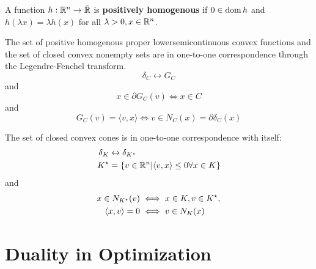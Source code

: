 \begin{defn}
  \label{defn:conjugate_functions:9}
  A function $h: \mathbb{R}^{n} \rightarrow \bar {\mathbb{R}}$ is \textbf{positively
    homogenous} if $0 \in \operatorname*{dom} h$ and $h(\lambda x) = \lambda h(x)$
  for all $\lambda > 0, x \in \mathbb{R}^{n}$.
\end{defn}

\begin{proposition}
  The set of positive homogenous proper lowersemicontinuous convex
  functions and the set of closed convex nonempty sets are in
  one-to-one correspondence through the Legendre-Fenchel transform.
  \begin{equation}
    \label{eq:64}
    \delta_{C} \leftrightarrow G_{C}    
  \end{equation}
  and
  \begin{equation}
    \label{eq:65}
    x \in \partial G_{C}(v) \iff x \in C
  \end{equation}
  and
  \begin{equation}
    \label{eq:66}
    G_{C}(v) = \langle v, x \rangle \iff v \in N_{C}(x) = \partial \delta_{C}(x)
  \end{equation}

  The set of closed convex cones is in one-to-one correspondence with
  itself:
  \begin{align}
    \label{eq:67}
    \delta_{K} &\leftrightarrow \delta_{K^{\star}} \\
    K^{\star} &= \{ v \in \R^{n} | \IP{v, x} \leq 0 \forall
    x \in K \}
  \end{align}
  and
  \begin{align}
    \label{eq:128}
    x \in N_{K^{\star}}(v) &\iff x \in K, v \in K^{\star}, \\
    \IP{x, v} = 0 &\iff v \in N_{K}(x)
  \end{align}
\end{proposition}

\chapter{Duality in Optimization}
\label{cha:duality-optimization}

